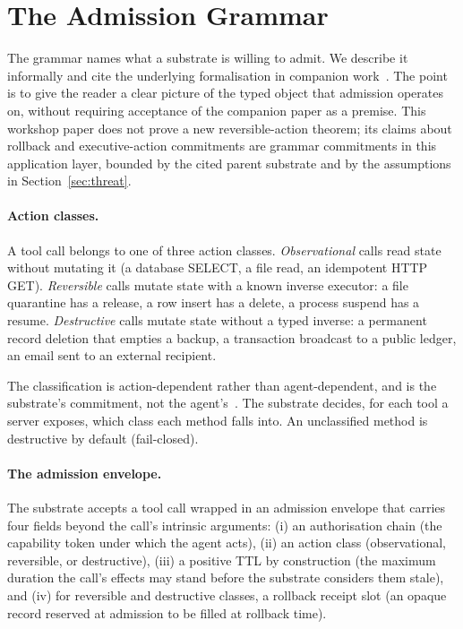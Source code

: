\section{The Admission Grammar}
\label{sec:grammar}

The grammar names what a substrate is willing to admit. We describe it informally and cite the underlying formalisation in companion work~\cite{programmableSovereignty2026}. The point is to give the reader a clear picture of the typed object that admission operates on, without requiring acceptance of the companion paper as a premise. This workshop paper does not prove a new reversible-action theorem; its claims about rollback and executive-action commitments are grammar commitments in this application layer, bounded by the cited parent substrate and by the assumptions in Section~\ref{sec:threat}.

\paragraph{Action classes.}
A tool call belongs to one of three action classes. \emph{Observational} calls read state without mutating it (a database SELECT, a file read, an idempotent HTTP GET). \emph{Reversible} calls mutate state with a known inverse executor: a file quarantine has a release, a row insert has a delete, a process suspend has a resume. \emph{Destructive} calls mutate state without a typed inverse: a permanent record deletion that empties a backup, a transaction broadcast to a public ledger, an email sent to an external recipient.

The classification is action-dependent rather than agent-dependent, and is the substrate's commitment, not the agent's~\cite{programmableSovereignty2026}. The substrate decides, for each tool a server exposes, which class each method falls into. An unclassified method is destructive by default (fail-closed).

\paragraph{The admission envelope.}
The substrate accepts a tool call wrapped in an admission envelope that carries four fields beyond the call's intrinsic arguments: (i) an authorisation chain (the capability token under which the agent acts), (ii) an action class (observational, reversible, or destructive), (iii) a positive TTL by construction (the maximum duration the call's effects may stand before the substrate considers them stale), and (iv) for reversible and destructive classes, a rollback receipt slot (an opaque record reserved at admission to be filled at rollback time).

